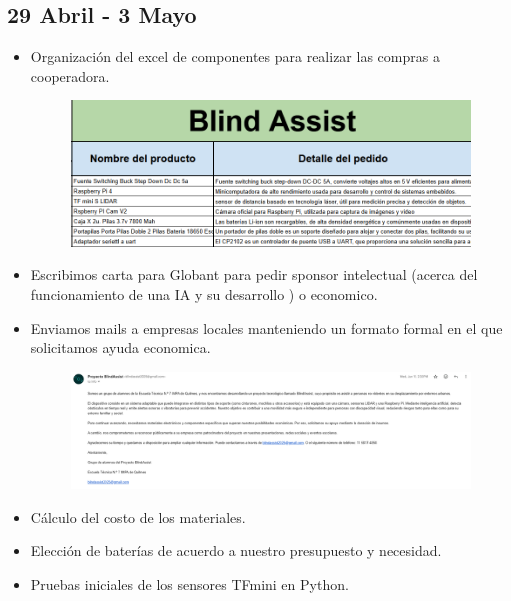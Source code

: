 \documentclass[12pt,a4paper]{article}
\begin{document}
\subsection*{29 Abril - 3 Mayo}

\begin{itemize}
    
\item Organización del excel de componentes para realizar las compras a cooperadora.

\begin{figure}[H]
    \includegraphics[width=\linewidth]{Carpeta de campo/Excel.png}
\end{figure}

\item Escribimos carta para Globant para pedir sponsor intelectual (acerca del funcionamiento de una IA y su desarrollo ) o economico. 

\item Enviamos mails a empresas locales manteniendo un formato formal en el que solicitamos ayuda economica.
\begin{figure}[H]
    \includegraphics[width=1\linewidth]{Carpeta de campo/Mail.png}
\end{figure}

\item Cálculo del costo de los materiales. 

\item Elección de baterías de acuerdo a nuestro presupuesto y necesidad.

\item Pruebas iniciales de los sensores TFmini en Python.

\end{itemize}
\end{document}
